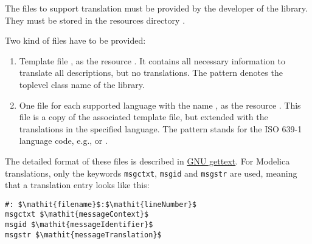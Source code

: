 The files to support translation must be provided by the developer of the library.
They must be stored in the resources directory .

Two kind of files have to be provided:
\begin{enumerate}
\item Template file , as the resource .
It contains all necessary information to translate all descriptions, but no translations.
The pattern  denotes the toplevel class name of the library.
\item One file for each supported language with the name , as the resource .
This file is a copy of the associated template file, but extended with the translations in the specified language.
The pattern  stands for the ISO 639-1 language code, e.g.,  or .
\end{enumerate}

The detailed format of these files is described in \href{https://www.gnu.org/software/gettext/manual/gettext.pdf}{GNU gettext}.
For Modelica translations, only the keywords \lstinline!msgctxt!, \lstinline!msgid! and \lstinline!msgstr! are used, meaning that a translation entry looks like this:
\begin{lstlisting}
#: $\mathit{filename}$:$\mathit{lineNumber}$
msgctxt $\mathit{messageContext}$
msgid $\mathit{messageIdentifier}$
msgstr $\mathit{messageTranslation}$
\end{lstlisting}


